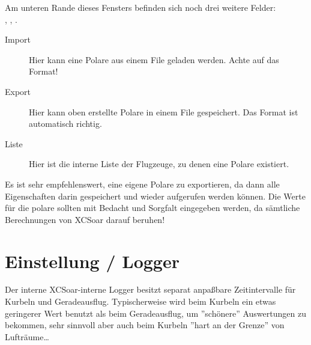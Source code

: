 Am unteren Rande dieses Fensters befinden sich noch drei weitere Felder:\\
,  ,  .
\begin{description}
\item[Import] Hier kann eine Polare aus einem File geladen werden. Achte auf das Format!
\item[Export] Hier kann oben erstellte Polare in einem File gespeichert. Das Format ist automatisch richtig.
\item[Liste] Hier ist die interne Liste der Flugzeuge, zu denen eine Polare existiert.
\end{description}

\tip Es ist sehr empfehlenswert, eine eigene Polare zu exportieren, da dann alle Eigenschaften darin gespeichert und wieder aufgerufen werden können.
Die Werte für  die polare sollten mit Bedacht und Sorgfalt eingegeben werden, da sämtliche Berechnungen von \textsf{XCSoar} darauf beruhen!
\section{Einstellung / Logger} \label{conf:logger}

Der interne \textsf{XCSoar}-interne Logger besitzt separat anpaßbare Zeitintervalle  für Kurbeln  und Geradeausflug.
Typischerweise wird beim Kurbeln ein etwas geringerer Wert benutzt als beim Geradeausflug, um ''schönere'' Auswertungen zu bekommen, sehr sinnvoll aber auch beim Kurbeln ''hart an der Grenze'' von Lufträume\dots

